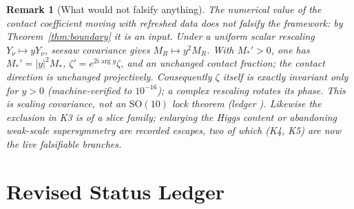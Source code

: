 \documentclass[
  aps,
  prd,
  preprint,
  nofootinbib,
  superscriptaddress,
  longbibliography
]{revtex4-2}
\newcommand{\SO}{\mathrm{SO}}
\newtheorem{remark}[theorem]{Remark}
\begin{document}
\begin{remark}[What would not falsify anything]
The numerical value of the contact coefficient moving with refreshed
data does not falsify the framework: by Theorem~\ref{thm:boundary} it
is an input.  Under a uniform scalar rescaling
\(Y_\nu\mapsto yY_\nu\), seesaw covariance gives
\(M_R\mapsto y^2M_R\).  With \(M_*'>0\), one has
\(M_*'=|y|^2M_*\), \(\zeta'=e^{2i\arg y}\zeta\), and an unchanged
contact fraction; the contact direction is unchanged projectively.
Consequently \(\zeta\) itself is exactly invariant only for \(y>0\)
(machine-verified to \(10^{-16}\)); a complex rescaling rotates its phase.
This is scaling covariance, not an \(\SO(10)\) lock theorem (ledger
).  Likewise
the exclusion in K3 is of a slice family; enlarging the Higgs content
or abandoning weak-scale supersymmetry are recorded escapes, two of
which (K4, K5) are now the live falsifiable branches.
\end{remark}

\section{Revised Status Ledger}
\label{sec:ledger}
\end{document}
